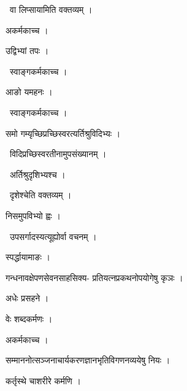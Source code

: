 \documentclass[10pt, openany, oneside]{book}
\begin{document}
\par\noindent\hspace{1.5em}{\vps वा॰}~{\qt वा लिप्सायामिति वक्तव्यम् ।}

\noindent अकर्मकाच्च ।

\noindent उद्विभ्यां तपः ।

\par\noindent\hspace{1.5em}{\vps वा॰}~{\qt स्वाङ्गकर्मकाच्च ।}

\noindent आङो यमहनः ।

\par\noindent\hspace{1.5em}{\vps वा॰}~{\qt स्वाङ्गकर्मकाच्च ।}

\noindent समो गम्यृच्छिप्रच्छिस्वरत्यर्तिश्रुविदिभ्यः ।

\par\noindent\hspace{1.5em}{\vps वा॰}~{\qt विदिप्रच्छिस्वरतीनामुपसंख्यानम् ।}

\par\noindent\hspace{1.5em}{\vps वा॰}~{\qt अर्तिश्रुदृशिभ्यश्च ।}

\par\noindent\hspace{1.5em}{\vps वा॰}~{\qt दृशेश्चेति वक्तव्यम् ।}

\noindent निसमुपविभ्यो ह्वः ।

\par\noindent\hspace{1.5em}{\vps वा॰}~{\qt उपसर्गादस्यत्यूह्योर्वा वचनम् ।}

\noindent स्पर्द्धायामाङः ।

\noindent गन्धनावक्षेपणसेवनसाहसिक्य- प्रतियत्नप्रकथनोपयोगेषु कृञः ।

\noindent अधेः प्रसहने ।

\noindent वेः शब्दकर्मणः ।

\noindent अकर्मकाच्च ।

\noindent सम्माननोत्सञ्जनाचार्यकरणज्ञानभृतिविगणनव्ययेषु नियः ।

\noindent कर्तृस्थे चाशरीरे कर्मणि ।
\end{document}
